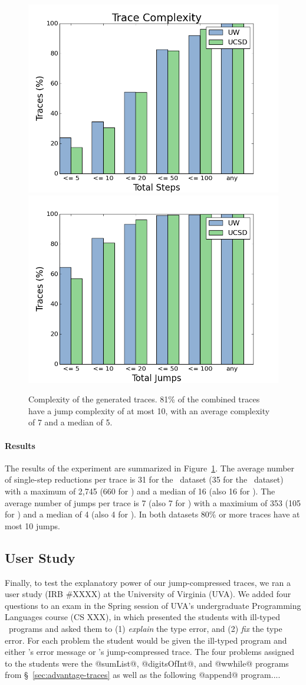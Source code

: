 %
\begin{figure}[t]
\centering
\includegraphics[width=0.49\linewidth]{trace_size_step.png}
\includegraphics[width=0.49\linewidth]{trace_size_jump.png}
\caption{Complexity of the generated traces. 81\% of the combined traces
  have a jump complexity of at most 10, with an average complexity of 7
  and a median of 5.}
\label{fig:results-complexity}
\end{figure}
%

\paragraph{Results}
\label{sec:results-complexity}
The results of the experiment are summarized in
Figure~\ref{fig:results-complexity}.
%
The average number of single-step reductions per trace is 31 for the
\ucsdbench\ dataset (35 for the \uwbench\ dataset) with a maximum of
2,745 (660 for \uwbench) and a median of 16 (also 16 for \uwbench).
%
The average number of jumps per trace is 7 (also 7 for \uwbench) with a
maximium of 353 (105 for \uwbench) and a median of 4 (also 4 for
\uwbench).
%
In both datasets 80\% or more traces have at most 10 jumps.
%



\subsection{User Study}
\label{sec:user-study}
Finally, to test the explanatory power of our jump-compressed traces, we
ran a user study (IRB \#XXXX) at the University of Virginia (UVA).
%
We added four questions to an exam in the Spring session of UVA's
undergraduate Programming Languages course (CS XXX), in which presented
the students with ill-typed \ocaml\ programs and asked them to
%
(1) \emph{explain} the type error, and
%
(2) \emph{fix} the type error.
%
For each problem the student would be given the ill-typed program and
either \ocaml's error message or \toolname's jump-compressed trace.
%
The four problems assigned to the students were the
%
@sumList@, @digitsOfInt@, and @wwhile@ programs from \S~\ref{sec:advantage-traces}
as well as the following @append@ program....


